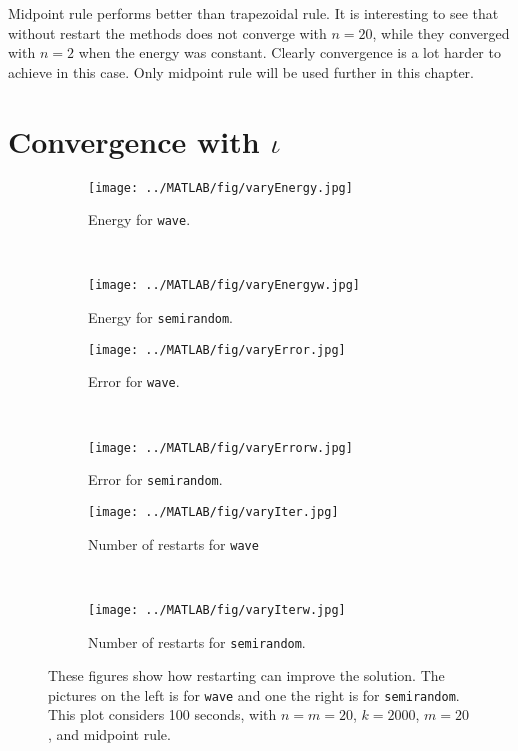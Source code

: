 Midpoint rule performs better than trapezoidal rule. It is interesting to see that without restart the methods does not converge with $n = 20$, while they converged with $n = 2$ when the energy was constant. Clearly convergence is a lot harder to achieve in this case. Only midpoint rule will be used further in this chapter.\\

\section{Convergence with $\iota$} %

\begin{figure}[H]
        \centering
        \begin{subfigure}[b]{0.45\textwidth}
                \texttt{[image: ../MATLAB/fig/varyEnergy.jpg]}
                \caption{ Energy for \texttt{wave}. }
                \label{fig:varyEnergy}
        \end{subfigure}%
        ~
        \begin{subfigure}[b]{0.45\textwidth}
                \texttt{[image: ../MATLAB/fig/varyEnergyw.jpg]}
                \caption{ Energy for \texttt{semirandom}. }
                \label{fig:varyEnergyw}
        \end{subfigure}
		
		\begin{subfigure}[b]{0.45\textwidth}
                \texttt{[image: ../MATLAB/fig/varyError.jpg]}
                \caption{ Error for \texttt{wave}. }
                \label{fig:varyError}
        \end{subfigure}%
        ~
        \begin{subfigure}[b]{0.45\textwidth}
                \texttt{[image: ../MATLAB/fig/varyErrorw.jpg]}
                \caption{ Error for \texttt{semirandom}. }
                \label{fig:varyErrorw}
        \end{subfigure}
        
        		\begin{subfigure}[b]{0.45\textwidth}
                \texttt{[image: ../MATLAB/fig/varyIter.jpg]}
                \caption{ Number of restarts for \texttt{wave} }
                \label{fig:varyIter}
        \end{subfigure}%
        ~
        \begin{subfigure}[b]{0.45\textwidth}
                \texttt{[image: ../MATLAB/fig/varyIterw.jpg]}
                \caption{ Number of restarts for \texttt{semirandom}. }
                \label{fig:varyIterw}
        \end{subfigure}
        \caption{ These figures show how restarting can improve the solution. The pictures on the left is for \texttt{wave} and one the right is for \texttt{semirandom}. This plot considers 100 seconds, with  $n=m=20$, $k = 2000$, $m = 20$, and midpoint rule. }
        \label{fig:variota}
\end{figure}
